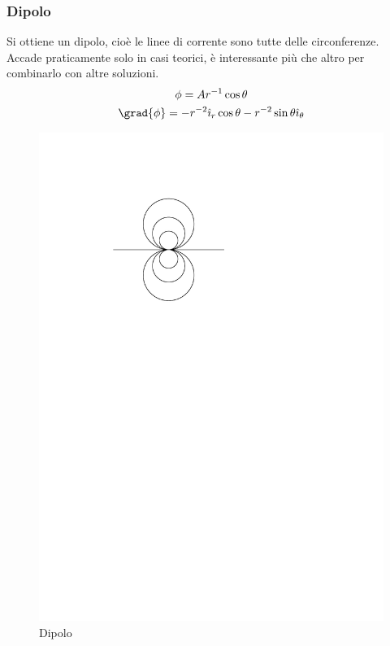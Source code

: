 \subsubsection{Dipolo}
Si ottiene un dipolo, cioè le linee di corrente sono tutte delle circonferenze.
Accade praticamente solo in casi teorici, è interessante più che altro per combinarlo con altre soluzioni.
%
	\begin{equation*}
		\begin{gathered}
			\phi = A r^{- 1} \cos{\theta}\\
			 \grad{\phi} = - r^{- 2} \hat{\imath}_r \cos{\theta} - r^{- 2} \sin{\theta} \hat{\imath}_\theta
		\end{gathered}
	\end{equation*}
%
	\begin{figure}[ht]
		\includegraphics[scale=0.7]{./7.3 Flusso irrotazionale/7.3-5}
		\centering
		\caption{Dipolo}
	\end{figure}
%

